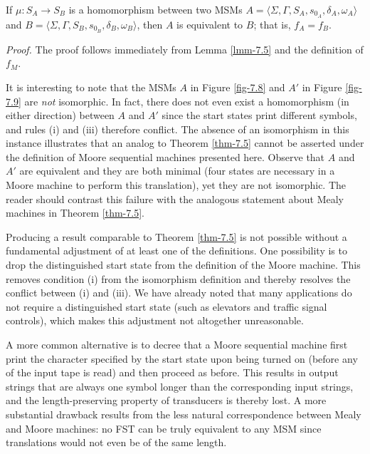 \begin{cor}\label{cor-7.9}
If $\mu$$:S_A \rightarrow S_B$ is a homomorphism between two MSMs
$A=\langle\Sigma,\Gamma,S_A,s_{0_A},\delta_A,\omega_A\rangle$ and
$B=\langle\Sigma,\Gamma,S_B,s_{0_B},\delta_B,\omega_B\rangle$, then $A$ is
equivalent to $B$; that is, $f_A = f_B$.

\emph{Proof.} The proof follows immediately from Lemma \ref{lmm-7.5} and the definition
of $f_M$.
\end{cor}

It is interesting to note that the MSMs $A$ in Figure \ref{fig-7.8} and $A'$ in Figure
\ref{fig-7.9} are \emph{not} isomorphic. In fact, there does not even exist a homomorphism (in
either direction) between $A$ and $A'$ since the start states print different
symbols, and rules (i) and (iii) therefore conflict. The absence of an
isomorphism in this instance illustrates that an analog to Theorem \ref{thm-7.5} cannot be
asserted under the definition of Moore sequential machines presented here.
Observe that $A$ and $A'$ are equivalent and they are both minimal (four states
are necessary in a Moore machine to perform this translation), yet they are not
isomorphic. The reader should contrast this failure with the analogous statement
about Mealy machines in Theorem \ref{thm-7.5}.

Producing a result comparable to Theorem \ref{thm-7.5} is not possible without a
fundamental adjustment of at least one of the definitions. One possibility is to
drop the distinguished start state from the definition of the Moore machine.
This removes condition (i) from the isomorphism definition and thereby resolves
the conflict between (i) and (iii). We have already noted that many applications
do not require a distinguished start state (such as elevators and traffic signal
controls), which makes this adjustment not altogether unreasonable.

A more common alternative is to decree that a Moore sequential machine first
print the character specified by the start state upon being turned on (before
any of the input tape is read) and then proceed as before. This results in
output strings that are always one symbol longer than the corresponding input
strings, and the length-preserving property of transducers is thereby lost. A
more substantial drawback results from the less natural correspondence between
Mealy and Moore machines: no FST can be truly equivalent to any MSM since
translations would not even be of the same length.

